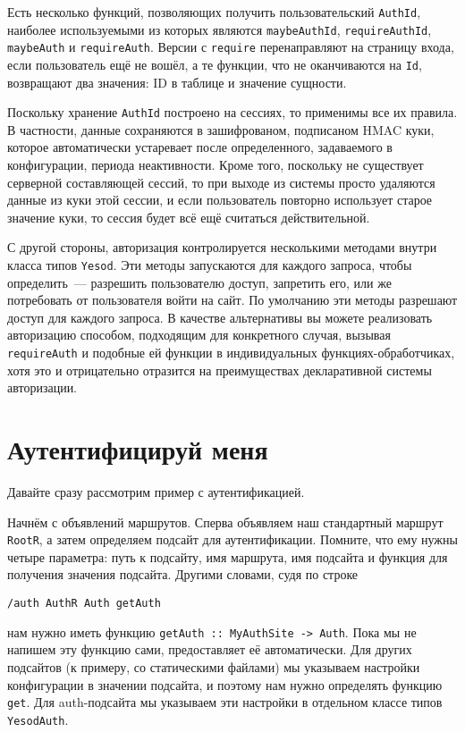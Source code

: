 Есть несколько функций, позволяющих получить пользовательский \lstinline'AuthId', наиболее используемыми из которых являются \lstinline'maybeAuthId', \lstinline'requireAuthId', \lstinline'maybeAuth' и \lstinline'requireAuth'. Версии с \lstinline'require' перенаправляют на страницу входа, если пользователь ещё не вошёл, а те функции, что не оканчиваются на \lstinline'Id', возвращают два значения: ID в таблице и значение сущности.

Поскольку хранение \lstinline'AuthId' построено на сессиях, то применимы все их правила. В частности, данные сохраняются в зашифрованом, подписаном HMAC куки, которое автоматически устаревает после определенного, задаваемого в конфигурации, периода неактивности. Кроме того, поскольку не существует серверной составляющей сессий, то при выходе из системы просто удаляются данные из куки этой сессии, и если пользователь повторно использует старое значение куки, то сессия будет всё ещё считаться действительной.

С другой стороны, авторизация контролируется несколькими методами внутри класса типов \lstinline'Yesod'. Эти методы запускаются для каждого запроса, чтобы определить~--- разрешить пользователю доступ, запретить его, или же потребовать от пользователя войти на сайт. По умолчанию эти методы разрешают доступ для каждого запроса. В качестве альтернативы вы можете реализовать авторизацию способом, подходящим для конкретного случая, вызывая \lstinline'requireAuth' и подобные ей функции в индивидуальных функциях-обработчиках, хотя это и отрицательно отразится на преимуществах декларативной системы авторизации.

\section{Аутентифицируй меня}

Давайте сразу рассмотрим пример с аутентификацией.


Начнём с объявлений маршрутов. Сперва объявляем наш стандартный маршрут \lstinline'RootR', а затем определяем подсайт для аутентификации. Помните, что ему нужны четыре параметра: путь к подсайту, имя маршрута, имя подсайта и функция для получения значения подсайта. Другими словами, судя по строке

\begin{lstlisting}
/auth AuthR Auth getAuth
\end{lstlisting}

нам нужно иметь функцию \lstinline'getAuth :: MyAuthSite -> Auth'. Пока мы не напишем эту функцию сами,  предоставляет её автоматически. Для других подсайтов (к примеру, со статическими файлами) мы указываем настройки конфигурации в значении подсайта, и поэтому нам нужно определять функцию \lstinline'get'. Для auth-подсайта мы указываем эти настройки в отдельном классе типов \lstinline'YesodAuth'.

